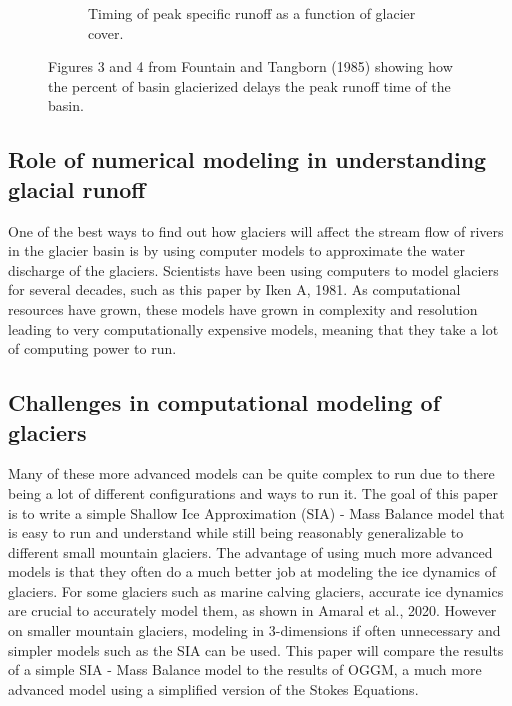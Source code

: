 \documentclass{article}
\begin{document}
\begin{figure}[h]
\begin{subfigure}[b]{0.49\textwidth}
        \caption{Timing of peak specific runoff as a function of glacier cover.}
        \label{fig:subfig2}
    \end{subfigure}
    \caption{Figures 3 and 4 from Fountain and Tangborn (1985) showing how the percent of basin glacierized delays the peak runoff time of the basin.}
    \label{fig:main_figure}
\end{figure}
\FloatBarrier
\subsection{Role of numerical modeling in understanding glacial runoff}
One of the best ways to find out how glaciers will affect the stream flow of rivers in the glacier basin is by using computer models to 
approximate the water discharge of the glaciers. Scientists have been using computers to model glaciers for several decades, such as this 
paper by Iken A, 1981. As computational resources have grown, these models have grown in complexity and resolution leading to very 
computationally expensive models, meaning that they take a lot of computing power to run.
\subsection{Challenges in computational modeling of glaciers}
Many of these more advanced models can be quite complex to run due to there being a lot of different configurations and ways to run it. The 
goal of this paper is to write a simple Shallow Ice Approximation (SIA) - Mass Balance model that is easy to run and understand while still 
being reasonably generalizable to different small mountain glaciers. The advantage of using much more advanced models is that they often do 
a much better job at modeling the ice dynamics of glaciers. For some glaciers such as marine calving glaciers, accurate ice dynamics are 
crucial to accurately model them, as shown in Amaral et al., 2020. However on smaller mountain glaciers, modeling in 3-dimensions if often 
unnecessary and simpler models such as the SIA can be used. This paper will compare the results of a simple SIA - Mass Balance model to the 
results of OGGM, a much more advanced model using a simplified version of the Stokes Equations.
\end{document}
